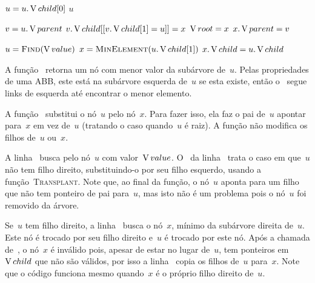 \documentclass[main.tex]{subfiles}
\begin{document}
\begin{algorithm}
\begin{algorithmic}[1]

		\State $u = u.\operatorname{V}{child}[0]$
	\EndWhile
	\State \Return $u$
\EndFunction

	\State $v = u.\operatorname{V}{parent}$
		\State $v.\operatorname{V}{child}[[v.\operatorname{V}{child}[1] = u]] = x$
	\Else
		\State $\operatorname{V}{root} = x$
	\EndIf
		\State $x.\operatorname{V}{parent} = v$
	\EndIf
\EndFunction

	\State $u = \Call{Find}{\val}$ \label{line:rmabb:findb}
	 \label{line:rmabb:if1}
		\State {}
	\Else
		\State $x = \Call{MinElement}{u.\child[1]}$ \label{line:rmabb:minb}
		\State {}
		\State {}
		\State $x.\operatorname{V}{child} = u.\operatorname{V}{child}$ \label{line:rmabb:cpchild}
	\EndIf
\EndFunction

\end{algorithmic}
\end{algorithm}

A função~ retorna um nó com menor valor da subárvore de~$u$. Pelas propriedades de uma ABB, este está na subárvore esquerda de~$u$ se esta existe, então o~ segue links de esquerda até encontrar o menor elemento.

A função~ substitui o nó~$u$ pelo nó~$x$. Para fazer isso, ela faz o pai de~$u$ apontar para~$x$ em vez de~$u$ (tratando o caso quando~$u$ é raiz). A função não modifica os filhos de~$u$ ou~$x$.

A linha~ busca pelo nó~$u$ com valor~$\operatorname{V}{value}$. O~ da linha~ trata o caso em que~$u$ não tem filho direito, substituindo-o por seu filho esquerdo, usando a função~\textsc{Transplant}. Note que, ao final da função, o nó~$u$ aponta para um filho que não tem ponteiro de pai para~$u$, mas isto não é um problema pois o nó~$u$ foi removido da árvore.

Se~$u$ tem filho direito, a linha~ busca o nó~$x$, mínimo da subárvore direita de~$u$. Este nó é trocado por seu filho direito e~$u$ é trocado por este nó. Após a chamada de~, o nó~$x$ é inválido pois, apesar de estar no lugar de~$u$, tem ponteiros em~$\operatorname{V}{child}$ que não são válidos, por isso a linha~ copia os filhos de~$u$ para~$x$. Note que o código funciona mesmo quando~$x$ é o próprio filho direito de~$u$.
\end{document}
